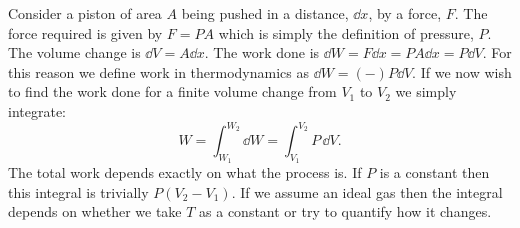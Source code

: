     \begin{example}
        Consider a piston of area \(A\) being pushed in a distance, \(\dd{x}\), by a force, \(F\).
        The force required is given by \(F = PA\) which is simply the definition of pressure, \(P\).
        The volume change is \(\dd{V} = A\dd{x}\).
        The work done is \(\dd{W} = F\dd{x} = PA\dd{x} = P\dd{V}\).
        For this reason we define work in thermodynamics as \(\dd{W} = (-)P\dd{V}\).
        If we now wish to find the work done for a finite volume change from \(V_1\) to \(V_2\) we simply integrate:
        \[W = \int_{W_1}^{W_2}\dd{W} = \int_{V_1}^{V_2}P\,\dd{V}.\]
        The total work depends exactly on what the process is.
        If \(P\) is a constant then this integral is trivially \(P(V_2 - V_1)\).
        If we assume an ideal gas then the integral depends on whether we take \(T\) as a constant or try to quantify how it changes.
    \end{example}
